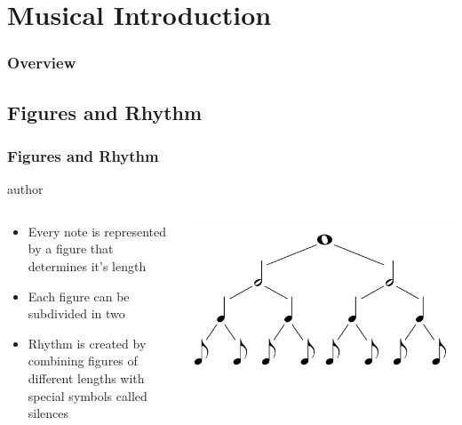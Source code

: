 \documentclass[english]{beamer}
\begin{document}
\section{Musical Introduction}
\begin{frame}
	\frametitle{Overview}
\end{frame}
\subsection{Figures and Rhythm}
	\begin{frame}
		\frametitle{Figures and Rhythm}
		\begin{beamercolorbox}[leftskip=8cm,center,wd=0.7\textwidth]{author}
		\begin{columns}[T]
		\begin{column}{.60\textwidth}%
		\begin{itemize}
			\item Every note is represented by a figure that determines it's length
			\item Each figure can be subdivided in two
			\item Rhythm is created by combining figures of different lengths with special symbols called silences
		\end{itemize}
		\end{column}
		\begin{column}{.39\textwidth}%
		\includegraphics[width=\linewidth]{imagenes/music_tree.pdf}
		\end{column}
		\end{columns}
		\end{beamercolorbox}
		
	\end{frame}
\end{document}
